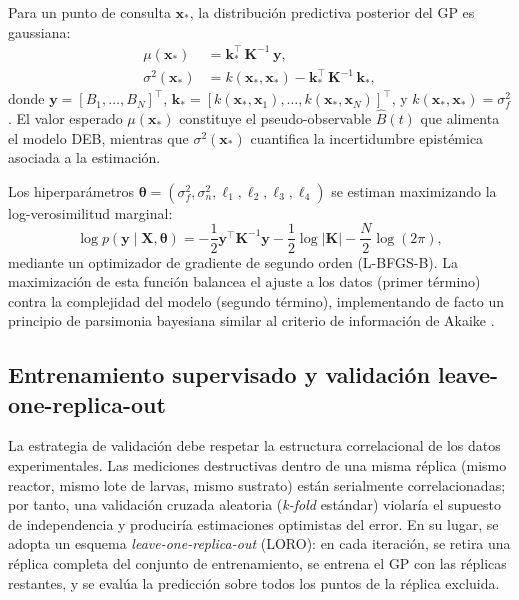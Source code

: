 Para un punto de consulta $\mathbf{x}_*$, la distribución predictiva posterior del GP es gaussiana:
\begin{align}
    \label{eq:cap4_media_posterior}
    \mu(\mathbf{x}_*) &= \mathbf{k}_{*}^{\top}\,\mathbf{K}^{-1}\,\mathbf{y}, \\
    \label{eq:cap4_varianza_posterior}
    \sigma^{2}(\mathbf{x}_*) &= k(\mathbf{x}_*, \mathbf{x}_*) - \mathbf{k}_{*}^{\top}\,\mathbf{K}^{-1}\,\mathbf{k}_{*},
\end{align}
donde $\mathbf{y} = [B_1, \dots, B_N]^\intercal$, $\mathbf{k}_{*} = [k(\mathbf{x}_*, \mathbf{x}_1), \dots, k(\mathbf{x}_*, \mathbf{x}_N)]^\intercal$, y $k(\mathbf{x}_*, \mathbf{x}_*) = \sigma_f^{2}$. El valor esperado $\mu(\mathbf{x}_*)$ constituye el pseudo-observable $\hat{B}(t)$ que alimenta el modelo DEB, mientras que $\sigma^{2}(\mathbf{x}_*)$ cuantifica la incertidumbre epistémica asociada a la estimación.

Los hiperparámetros $\boldsymbol{\theta} = (\sigma_f^{2}, \sigma_n^{2}, \ell_1, \ell_2, \ell_3, \ell_4)$ se estiman maximizando la log-verosimilitud marginal:
\begin{equation}
    \label{eq:cap4_log_verosimilitud}
    \log p(\mathbf{y} \mid \mathbf{X}, \boldsymbol{\theta}) =
    -\frac{1}{2}\mathbf{y}^{\top}\mathbf{K}^{-1}\mathbf{y}
    -\frac{1}{2}\log|\mathbf{K}|
    -\frac{N}{2}\log(2\pi),
\end{equation}
mediante un optimizador de gradiente de segundo orden (L-BFGS-B). La maximización de esta función balancea el ajuste a los datos (primer término) contra la complejidad del modelo (segundo término), implementando de facto un principio de parsimonia bayesiana similar al criterio de información de Akaike \parencite{adadiPeekingBlackBoxSurvey2018}.

\subsection{Entrenamiento supervisado y validación leave-one-replica-out}
\label{subsec:cap4_gp_entrenamiento}

La estrategia de validación debe respetar la estructura correlacional de los datos experimentales. Las mediciones destructivas dentro de una misma réplica (mismo reactor, mismo lote de larvas, mismo sustrato) están serialmente correlacionadas; por tanto, una validación cruzada aleatoria (\emph{k-fold} estándar) violaría el supuesto de independencia y produciría estimaciones optimistas del error. En su lugar, se adopta un esquema \emph{leave-one-replica-out} (LORO): en cada iteración, se retira una réplica completa del conjunto de entrenamiento, se entrena el GP con las réplicas restantes, y se evalúa la predicción sobre todos los puntos de la réplica excluida.

